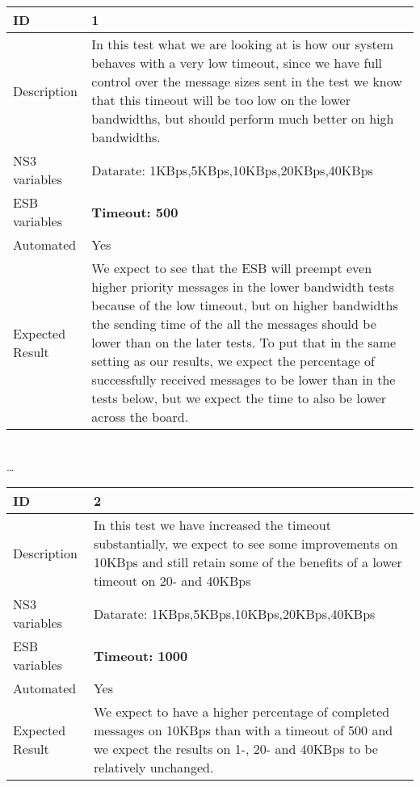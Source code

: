 \begin{center}

\begin{tabular}{| p{4cm} | p{8cm} |}%
    \hline
    ID & 1 \\
    \hline
    Description &  In this test what we are looking at is how our system behaves with a very low timeout, since we have full control over the message sizes sent in the test we know that this timeout will be too low on the lower bandwidths, but should perform much better on high bandwidths. \\
    \hline
    NS3 variables & Datarate: 1KBps,5KBps,10KBps,20KBps,40KBps \\
    \hline
    ESB variables & \textbf{Timeout: 500} \\
    \hline
    Automated & Yes \\
    \hline
    Expected Result & We expect to see that the ESB will preempt even higher priority messages in the lower bandwidth tests because of the low timeout, but on higher bandwidths the sending time of the all the messages should be lower than on the later tests. To put that in the same setting as our results, we expect the percentage of successfully received messages to be lower than in the tests below, but we expect the time to also be lower across the board.  \\
    \hline
\end{tabular}

\\ \ldots \\

\begin{tabular}{| p{4cm} | p{8cm} |}%
    \hline
    ID & 2 \\
    \hline
    Description & In this test we have increased the timeout substantially, we expect to see some improvements on 10KBps and still retain some of the benefits of a lower timeout on 20- and 40KBps \\
    \hline
    NS3 variables & Datarate: 1KBps,5KBps,10KBps,20KBps,40KBps \\
    \hline
    ESB variables & \textbf{Timeout: 1000} \\
    \hline
    Automated & Yes \\
    \hline
    Expected Result & We expect to have a higher percentage of completed messages on 10KBps than with a timeout of 500 and we expect the results on 1-, 20- and 40KBps to be relatively unchanged. \\
    \hline
\end{tabular}


\end{center}
